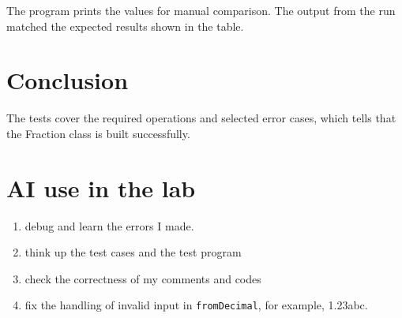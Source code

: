 \documentclass[10pt,a4paper]{article}
\newcommand{\code}[1]{\texttt{#1}}
\begin{document}
The program prints the values for manual comparison.
The output from the run matched the expected results shown in the table.

\section{Conclusion}

The tests cover the required operations and selected error cases, which tells that the Fraction
class is built successfully.

\section{AI use in the lab}

\begin{enumerate}
\setlength{\itemsep}{0pt}
\setlength{\parskip}{0pt}
\item debug and learn the errors I made.
\item think up the test cases and the test program
\item check the correctness of my comments and codes
\item fix the handling of invalid input in \code{fromDecimal}, for example, \textquotedbl 1.23abc\textquotedbl.
\end{enumerate}
\end{document}
